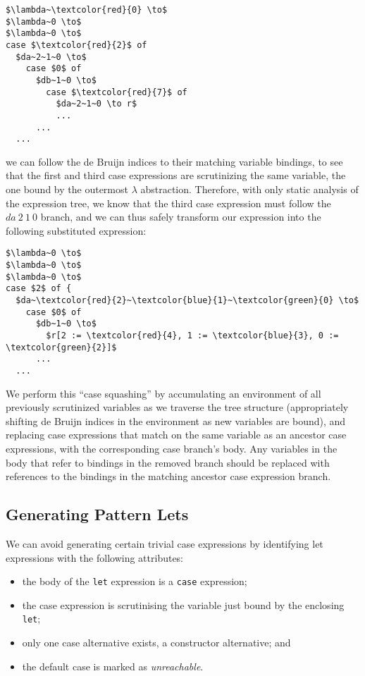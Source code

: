 \begin{lstlisting}[style=math]
$\lambda~\textcolor{red}{0} \to$
$\lambda~0 \to$
$\lambda~0 \to$
case $\textcolor{red}{2}$ of
  $da~2~1~0 \to$
    case $0$ of
      $db~1~0 \to$
        case $\textcolor{red}{7}$ of
          $da~2~1~0 \to r$
          ...
      ...
  ...
\end{lstlisting}

we can follow the de Bruijn indices to their matching variable bindings, to see that the first and third case expressions are scrutinizing the same variable, the one bound by the outermost $\lambda$ abstraction. Therefore, with only static analysis of the expression tree, we know that the third case expression must follow the $da~2~1~0$ branch, and we can thus safely transform our expression into the following substituted expression:

\begin{lstlisting}[style=math]
$\lambda~0 \to$
$\lambda~0 \to$
$\lambda~0 \to$
case $2$ of {
  $da~\textcolor{red}{2}~\textcolor{blue}{1}~\textcolor{green}{0} \to$
    case $0$ of
      $db~1~0 \to$
        $r[2 := \textcolor{red}{4}, 1 := \textcolor{blue}{3}, 0 := \textcolor{green}{2}]$
      ...
  ...
\end{lstlisting}

We perform this ``case squashing'' by accumulating an environment of all previously scrutinized variables as we traverse the tree structure (appropriately shifting de Bruijn indices in the environment as new variables are bound), and replacing case expressions that match on the same variable as an ancestor case expressions, with the corresponding case branch's body. Any variables in the body that refer to bindings in the removed branch should be replaced with references to the bindings in the matching ancestor case expression branch.

\subsection{Generating Pattern Lets}

We can avoid generating certain trivial case expressions by identifying let expressions with the following attributes:
\begin{itemize}
  \item the body of the \lstinline{let} expression is a \lstinline{case} expression;
  \item the case expression is scrutinising the variable just bound by the enclosing \lstinline{let};
  \item only one case alternative exists, a constructor alternative; and
  \item the default case is marked as \textit{unreachable}.
\end{itemize}

